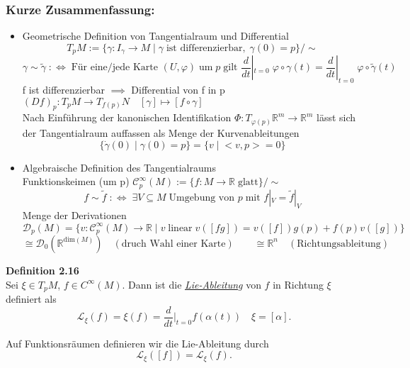 \documentclass[fleqn, 12pt, letterpaper]{article}
\newcommand{\txt}[1]{\text{#1}}
\begin{document}
\subsubsection*{Kurze Zusammenfassung:}
\begin{itemize}
  \item Geometrische Definition von Tangentialraum und Differential 
  \[T_pM:=\{\gamma:I_\gamma \to M\;|\;\gamma \;\txt{ist differenzierbar}, \; \gamma(0)=p\}/\sim\]
  \[\gamma \sim \tilde{\gamma}\;:\Leftrightarrow\; \txt{Für eine/jede Karte }(U, \varphi)\;\txt{um}\;p\;\txt{gilt }\frac{d}{dt}|_{t=0}\;\varphi \circ \gamma(t)= \frac{d}{dt}|_{t=0}\;\varphi \circ \tilde{\gamma}(t)\]
  f ist differenzierbar $\implies$ Differential von f in p $(Df)_p: T_pM \to T_{f(p)}N\quad [\gamma]\mapsto[f \circ \gamma]$\\
  Nach Einführung der kanonischen Identifikation $\Phi:T_{\varphi(p)}\mathbb{R}^m\to \mathbb{R}^m$ lässt sich der Tangentialraum auffassen als Menge der Kurvenableitungen 
  \[\{\dot{\gamma}(0)\;|\;\gamma(0)=p\}=\{v\;|\;<v,p>=0\}\]

  \item Algebraische Definition des Tangentialraums\\
   Funktionskeimen (um p) $\mathcal{C}_p^\infty(M):=\{f:M\to\mathbb{R}\;\txt{glatt}\}/\sim$
   \[f \sim \tilde{f}\;:\Leftrightarrow \;\exists V\subseteq M \;\txt{Umgebung von }p \;\txt{mit } f|_V=\tilde{f}|_V\]
   Menge der Derivationen\\
   \[\mathcal{D}_p(M)=\{v:\mathcal{C}_p^\infty(M)\to \mathbb{R}\;|\;v \;\txt{linear}\;v([f g])=v([f])g(p)+f(p)v([g])\}\]
   \[\cong \mathcal{D}_0(\mathbb{R}^{\txt{dim}(M)})\quad (\txt{druch Wahl einer Karte})\qquad \cong \mathbb{R}^n \quad (\txt{Richtungsableitung})\]
\end{itemize}

\textbf{Definition 2.16} \\
Sei \(\xi \in T_p M\), \(f \in C^\infty(M)\). Dann ist die \emph{\underline{Lie-Ableitung}} von \(f\) in Richtung \(\xi\) definiert als
\[
\mathcal{L}_\xi(f) = \xi(f)=\frac{d}{dt}|_{t=0}f(\alpha(t))\quad \xi = [\alpha].
\]

Auf Funktionsräumen definieren wir die Lie-Ableitung durch
\[
\mathcal{L}_\xi([f]) = \mathcal{L}_{\xi}(f).
\]

\vspace{1em}
\end{document}
